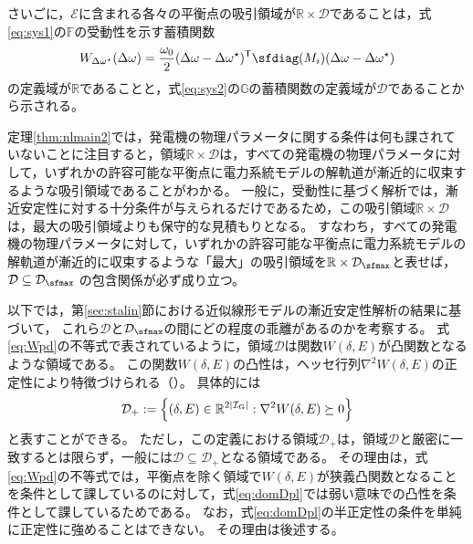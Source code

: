 \documentclass[tombow,dvipdfmx]{corona-a5-1.1}
\begin{document}
\begin{証明}
さいごに，$\mathcal{E}$に含まれる各々の平衡点の吸引領域が$\mathbb{R}\times \mathcal{D}$であることは，式\ref{eq:sys1}の$\mathds{F}$の受動性を示す蓄積関数
\begin{align*}
W_{\Delta \omega^{\star}}(\Delta \omega)= \frac{\omega_0}{2}
(\Delta \omega -\Delta \omega^{\star})^{\sf T}
\sfdiag(M_i)
(\Delta \omega -\Delta \omega^{\star})
\end{align*}
の定義域が$\mathbb{R}$であることと，式\ref{eq:sys2}の$\mathds{G}$の蓄積関数の定義域が$\mathcal{D}$であることから示される。
\end{証明}

定理\ref{thm:nlmain2}では，発電機の物理パラメータに関する条件は何も課されていないことに注目すると，領域$\mathbb{R}\times \mathcal{D}$は，すべての発電機の物理パラメータに対して，いずれかの許容可能な平衡点に電力系統モデルの解軌道が漸近的に収束するような吸引領域であることがわかる。
一般に，受動性に基づく解析では，漸近安定性に対する十分条件が与えられるだけであるため，この吸引領域$\mathbb{R}\times \mathcal{D}$は，最大の吸引領域よりも保守的な見積もりとなる。
すなわち，すべての発電機の物理パラメータに対して，いずれかの許容可能な平衡点に電力系統モデルの解軌道が漸近的に収束するような「最大」の吸引領域を$\mathbb{R}\times\mathcal{D}_{\sfmax}$と表せば，
$\mathcal{D} \subseteq \mathcal{D}_{\sfmax}$
の包含関係が必ず成り立つ。

以下では，第\ref{sec:stalin}節における近似線形モデルの漸近安定性解析の結果に基づいて，
これら$\mathcal{D}$と$\mathcal{D}_{\sfmax}$の間にどの程度の乖離があるのかを考察する。
式\ref{eq:Wpd}の不等式で表されているように，領域$\mathcal{D}$は関数$W(\delta,E)$が凸関数となるような領域である。
この関数$W(\delta,E)$の凸性は，ヘッセ行列$\nabla^2 W(\delta,E)$の正定性により特徴づけられる（）。
具体的には
\begin{align}\label{eq:domDpl}
\mathcal{D}_{+}:= \left\{
(\delta, E) \in \mathbb{R}^{2 |\mathcal{I}_{\rm G}|}  :
\nabla^2 W(\delta,E) \succeq 0
\right\}
\end{align}
と表すことができる。
ただし，この定義における領域$\mathcal{D}_{+}$は，領域$\mathcal{D}$と厳密に一致するとは限らず，一般には$\mathcal{D} \subseteq \mathcal{D}_{+}$となる領域である。
その理由は，式\ref{eq:Wpd}の不等式では，平衡点を除く領域で$W(\delta,E)$が狭義凸関数となることを条件として課しているのに対して，式\ref{eq:domDpl}では弱い意味での凸性を条件として課しているためである。
なお，式\ref{eq:domDpl}の半正定性の条件を単純に正定性に強めることはできない。
その理由は後述する。
\end{document}
